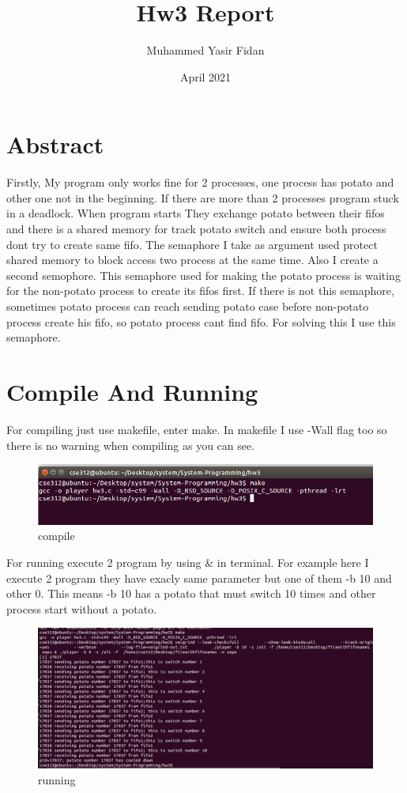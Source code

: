 \documentclass{article}
\title{Hw3 Report}
\author{Muhammed Yasir Fidan }
\date{April 2021}
\begin{document}
\maketitle

\section{Abstract}
Firstly, My program only works fine for 2 processes, one process has potato and other one not in the beginning. If there are more than 2 processes program stuck in a deadlock. When program starts
They exchange potato between their fifos and there is a shared memory for track potato switch and ensure both process dont try to create same fifo. The semaphore I take as argument used protect shared memory to block access two process at the same time. Also I create a second semophore. This semaphore used for making the potato process is waiting for the non-potato process to create its fifos first. If there is not this semaphore, sometimes potato process can reach sending potato case before non-potato process create his fifo, so potato process cant find fifo. For solving this I use this semaphore.


\section{Compile And Running}
For compiling just use makefile, enter make. In makefile I use -Wall flag too so there is no warning when compiling as you can see.

\begin{figure}[h!]
\centering
\includegraphics[scale=0.5]{hw_3.png}
\caption{compile}
\label{fig:compile}
\end{figure}

For running execute 2 program by using & in terminal. For example here I execute 2 program they have exacly same parameter but one of them -b 10 and other 0. This means -b 10 has a potato that must switch 10 times and other process start without a potato.
\newpage

\begin{figure}[h!]
\centering
\includegraphics[scale=0.35]{hw3_1.png}
\caption{running}
\label{fig:running}
\end{figure}
\end{document}
